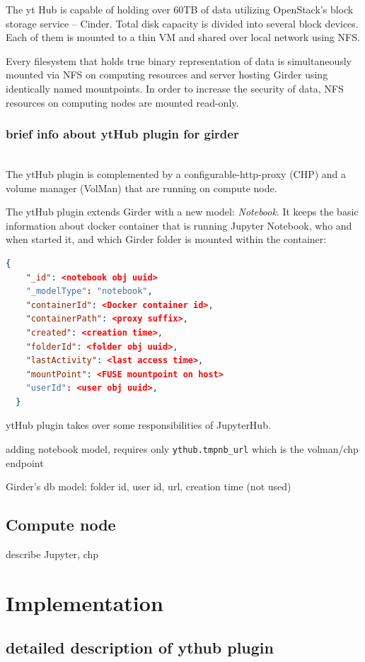\documentclass[conference]{IEEEtran}
\begin{document}
The yt Hub is capable of holding over 60TB of data utilizing OpenStack's block
storage service -- Cinder. Total disk capacity is divided into several block
devices. Each of them is mounted to a thin VM and shared over local network
using NFS. 

Every filesystem that holds true binary representation of data is simultaneously
mounted via NFS on computing resources and server hosting Girder using
identically named mountpoints. In order to increase the security of data, NFS
resources on computing nodes are mounted read-only.

\subsubsection*{brief info about ytHub plugin for girder}~\\
The ytHub plugin is complemented by a configurable-http-proxy (CHP) and a volume
manager (VolMan) that are running on compute node.

The ytHub plugin extends Girder with a new model: \emph{Notebook}. It keeps the
basic information about docker container that is running Jupyter Notebook, who
and when started it, and which Girder folder is mounted within the container:
\begin{lstlisting}[language=json,firstnumber=1]
  {
    "_id": <notebook obj uuid>
    "_modelType": "notebook",
    "containerId": <Docker container id>,
    "containerPath": <proxy suffix>,
    "created": <creation time>,
    "folderId": <folder obj uuid>,
    "lastActivity": <last access time>,
    "mountPoint": <FUSE mountpoint on host> 
    "userId": <user obj uuid>,
  }
\end{lstlisting}

ytHub plugin takes over some responsibilities of JupyterHub.

adding notebook model, requires only \verb|ythub.tmpnb_url| which is the
volman/chp endpoint

Girder's db model: folder id, user id, url, creation time (not used)

\subsection{Compute node}
describe Jupyter, chp

\section{Implementation}
\subsection{detailed description of ythub plugin}~\label{sec:ythub_plugin}
\end{document}
